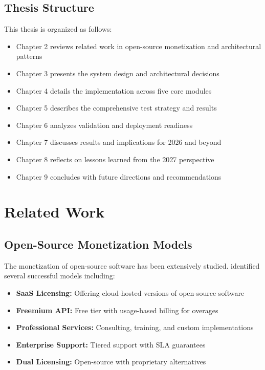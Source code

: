 \documentclass[12pt]{report}
\begin{document}
\section{Thesis Structure}

This thesis is organized as follows:

\begin{itemize}
    \item Chapter 2 reviews related work in open-source monetization and architectural patterns
    \item Chapter 3 presents the system design and architectural decisions
    \item Chapter 4 details the implementation across five core modules
    \item Chapter 5 describes the comprehensive test strategy and results
    \item Chapter 6 analyzes validation and deployment readiness
    \item Chapter 7 discusses results and implications for 2026 and beyond
    \item Chapter 8 reflects on lessons learned from the 2027 perspective
    \item Chapter 9 concludes with future directions and recommendations
\end{itemize}

\chapter{Related Work}

\section{Open-Source Monetization Models}

The monetization of open-source software has been extensively studied. \cite{lakhani2005perspectives} identified several successful models including:

\begin{itemize}
    \item \textbf{SaaS Licensing:} Offering cloud-hosted versions of open-source software
    \item \textbf{Freemium API:} Free tier with usage-based billing for overages
    \item \textbf{Professional Services:} Consulting, training, and custom implementations
    \item \textbf{Enterprise Support:} Tiered support with SLA guarantees
    \item \textbf{Dual Licensing:} Open-source with proprietary alternatives
\end{itemize}
\end{document}
